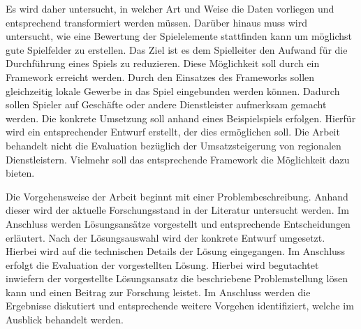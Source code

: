 Es wird daher untersucht, in welcher Art und Weise die Daten vorliegen und entsprechend transformiert werden müssen.
Darüber hinaus muss wird untersucht, wie eine Bewertung der Spielelemente stattfinden kann um möglichst gute Spielfelder zu erstellen.
Das Ziel ist es dem Spielleiter den Aufwand für die Durchführung eines Spiels zu reduzieren. Diese Möglichkeit soll durch ein Framework erreicht werden. Durch den Einsatzes des Frameworks sollen gleichzeitig lokale Gewerbe in das Spiel eingebunden werden können. Dadurch sollen Spieler auf Geschäfte oder andere Dienstleister aufmerksam gemacht werden.
Die konkrete Umsetzung soll anhand eines Beispielspiels erfolgen.
Hierfür wird ein entsprechender Entwurf erstellt, der dies ermöglichen soll.
Die Arbeit behandelt nicht die Evaluation bezüglich der Umsatzsteigerung von regionalen Dienstleistern. Vielmehr soll das entsprechende Framework die Möglichkeit dazu bieten.

Die Vorgehensweise der Arbeit beginnt mit einer Problembeschreibung. Anhand dieser wird der aktuelle Forschungsstand in der Literatur untersucht werden. Im Anschluss werden Lösungsansätze vorgestellt und entsprechende Entscheidungen erläutert. Nach der Lösungsauswahl wird der konkrete Entwurf umgesetzt. Hierbei wird auf die technischen Details der Lösung eingegangen. Im Anschluss erfolgt die Evaluation der vorgestellten Lösung. Hierbei wird begutachtet inwiefern der vorgestellte Lösungsansatz die beschriebene Problemstellung lösen kann und einen Beitrag zur Forschung leistet. Im Anschluss werden die Ergebnisse diskutiert und entsprechende weitere Vorgehen identifiziert, welche im Ausblick behandelt werden.

